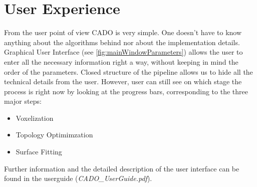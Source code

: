 \section{User Experience}
\label{sec:uex}
From the user point of view CADO  is very simple. One doesn't have to know anything about the algorithms behind nor about the implementation details. Graphical User Interface (see \autoref{fig:mainWindowParameters}) allows the user to enter all the necessary information right a way, without keeping in mind the order of the parameters. Closed structure of the pipeline allows us to hide all the technical details from the user. However, user can still see on which stage the process is right now by looking at the progress bars, corresponding to the three major steps:
\begin{itemize}
\item Voxelization
\item Topology Optimimzation
\item Surface Fitting
\end{itemize}
Further information and the detailed description of the user interface can be found in the userguide (\textit{CADO\_UserGuide.pdf}).
